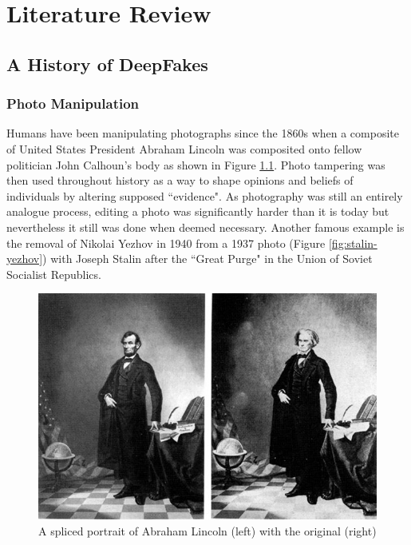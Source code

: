 \chapter{Literature Review}
\label{ch:background}

\section{A History of DeepFakes}


\subsection{Photo Manipulation}

Humans have been manipulating photographs since the 1860s when a composite of United States President Abraham Lincoln was composited onto fellow politician John Calhoun's body\cite{singh2018art} as shown in Figure \ref{fig:lincoln}. Photo tampering was then used throughout history as a way to shape opinions and beliefs of individuals by altering supposed ``evidence". As photography was still an entirely analogue process, editing a photo was significantly harder than it is today but nevertheless it still was done when deemed necessary. Another famous example is the removal of Nikolai Yezhov in 1940 from a 1937 photo (Figure \ref{fig:stalin-yezhov}) with Joseph Stalin after the ``Great Purge" in the Union of Soviet Socialist Republics.

\begin{figure}[H]
    \centering
    \includegraphics[width=0.5\linewidth]{dissertation//figures/lincoln1960.jpg}
    \caption{A spliced portrait of Abraham Lincoln (left) with the original (right)\cite{singh2018art}}
    \label{fig:lincoln}
\end{figure}

